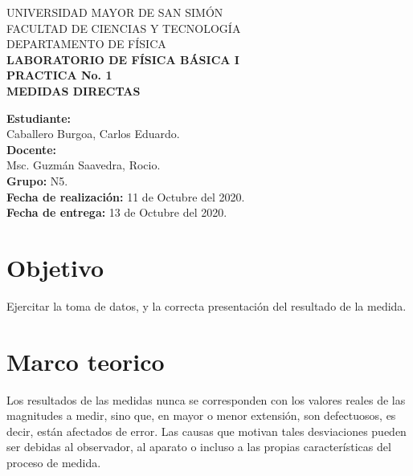\documentclass[letter,11pt]{article}
\newcommand{\blankpage}{
    \newpage
    \thispagestyle{empty}
    \mbox{}
    \newpage
}
\begin{document}
\begin{titlepage}
\begin{center}
{\Large UNIVERSIDAD MAYOR DE SAN SIMÓN}\\
\vspace*{0.15cm}
{\large FACULTAD DE CIENCIAS Y TECNOLOGÍA}\\
\vspace*{0.10cm}
DEPARTAMENTO DE FÍSICA\\
\vspace*{3.0cm}
{\Large \textbf{LABORATORIO DE FÍSICA BÁSICA I}}\\
\vspace*{0.3cm}
{\Large \textbf{PRACTICA No. 1}}\\
\vspace*{3.5cm}
{\Large \textbf{MEDIDAS DIRECTAS}}\\
\end{center}

\vspace*{7.4cm}
\leftskip=7.95cm
\noindent
\textbf{Estudiante:}\\
Caballero Burgoa, Carlos Eduardo.\\
\newline
\textbf{Docente:}\\
Msc. Guzmán Saavedra, Rocio.\\
\newline
\textbf{Grupo:} N5.\\
\textbf{Fecha de realización:} 11 de Octubre del 2020.\\
\textbf{Fecha de entrega:} 13 de Octubre del 2020.\\

\end{titlepage}

\blankpage

\section{Objetivo}
Ejercitar la toma de datos, y la correcta presentación del resultado de la
medida.

\section{Marco teorico}
Los resultados de las medidas nunca se corresponden con los valores reales de
las magnitudes a medir, sino que, en mayor o menor extensión, son defectuosos,
es decir, están afectados de error. Las causas que motivan tales desviaciones
pueden ser debidas al observador, al aparato o incluso a las propias
características del proceso de medida.
\end{document}
